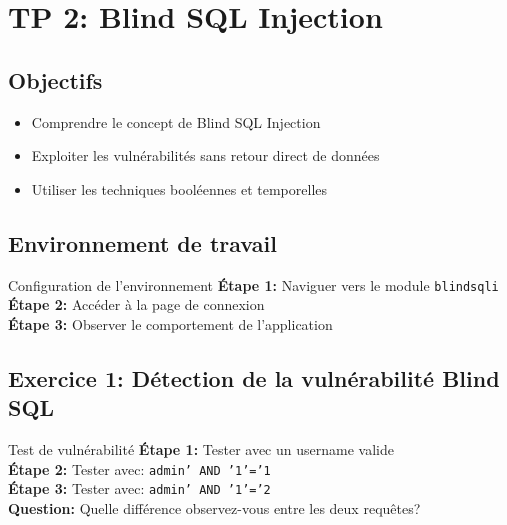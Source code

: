 \documentclass[12pt,a4paper]{article}
\begin{document}
\section{TP 2: Blind SQL Injection}

\subsection{Objectifs}
\begin{itemize}
    \item Comprendre le concept de Blind SQL Injection
    \item Exploiter les vulnérabilités sans retour direct de données
    \item Utiliser les techniques booléennes et temporelles
\end{itemize}

\subsection{Environnement de travail}
\begin{exercicebox}{Configuration de l'environnement}
\textbf{Étape 1:} Naviguer vers le module \texttt{blindsqli}\\
\textbf{Étape 2:} Accéder à la page de connexion\\
\textbf{Étape 3:} Observer le comportement de l'application
\end{exercicebox}

\begin{answerbox}
\vspace{7cm}
\end{answerbox}

\subsection{Exercice 1: Détection de la vulnérabilité Blind SQL}

\begin{exercicebox}{Test de vulnérabilité}
\textbf{Étape 1:} Tester avec un username valide\\
\textbf{Étape 2:} Tester avec: \texttt{admin' AND '1'='1}\\
\textbf{Étape 3:} Tester avec: \texttt{admin' AND '1'='2}\\
\textbf{Question:} Quelle différence observez-vous entre les deux requêtes?
\end{exercicebox}
\end{document}
